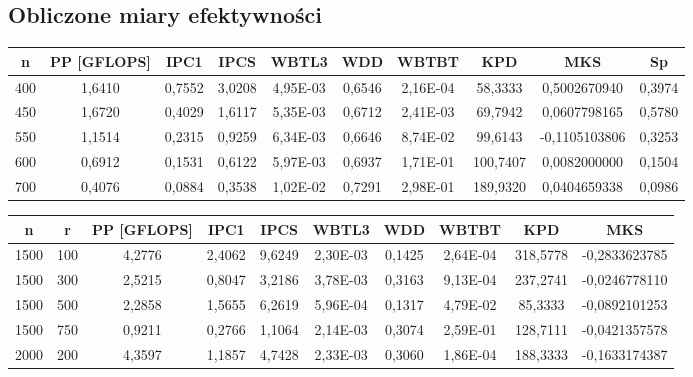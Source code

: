 \documentclass[10pt,a4paper]{article}
\begin{document}
\subsection{Obliczone miary efektywności}
\begin{center}
	\begin{tabular}{ |c|c|c|c|c|c|c|c|c|c| }
		\hline
		n   & PP [GFLOPS] & IPC1   & IPCS   & WBTL3    & WDD    & WBTBT    & KPD      & MKS          & Sp     \\
		\hline
		400 & 1,6410      & 0,7552 & 3,0208 & 4,95E-03 & 0,6546 & 2,16E-04 & 58,3333  & 0,5002670940 & 0,3974 \\
		\hline
		450 & 1,6720      & 0,4029 & 1,6117 & 5,35E-03 & 0,6712 & 2,41E-03 & 69,7942  & 0,0607798165 & 0,5780 \\
		\hline
		550 & 1,1514      & 0,2315 & 0,9259 & 6,34E-03 & 0,6646 & 8,74E-02 & 99,6143  & -0,1105103806 & 0,3253 \\
		\hline
		600 & 0,6912      & 0,1531 & 0,6122 & 5,97E-03 & 0,6937 & 1,71E-01 & 100,7407 & 0,0082000000 & 0,1504 \\
		\hline
		700 & 0,4076      & 0,0884 & 0,3538 & 1,02E-02 & 0,7291 & 2,98E-01 & 189,9320 & 0,0404659338 & 0,0986 \\
		\hline
	\end{tabular}
\end{center}

\begin{center}
	\begin{tabular}{ |c|c|c|c|c|c|c|c|c|c| }
		\hline
		n    & r   & PP [GFLOPS] & IPC1   & IPCS   & WBTL3    & WDD    & WBTBT    & KPD      & MKS          \\
		\hline
		1500 & 100 & 4,2776      & 2,4062 & 9,6249 & 2,30E-03 & 0,1425 & 2,64E-04 & 318,5778 & -0,2833623785 \\
		\hline
		1500 & 300 & 2,5215      & 0,8047 & 3,2186 & 3,78E-03 & 0,3163 & 9,13E-04 & 237,2741 & -0,0246778110 \\
		\hline
		1500 & 500 & 2,2858      & 1,5655 & 6,2619 & 5,96E-04 & 0,1317 & 4,79E-02 & 85,3333  & -0,0892101253 \\
		\hline
		1500 & 750 & 0,9211      & 0,2766 & 1,1064 & 2,14E-03 & 0,3074 & 2,59E-01 & 128,7111 & -0,0421357578 \\
		\hline
		\hline
		2000 & 200 & 4,3597      & 1,1857 & 4,7428 & 2,33E-03 & 0,3060 & 1,86E-04 & 188,3333 & -0,1633174387 \\
		\hline
	\end{tabular}
\end{center}
\end{document}
